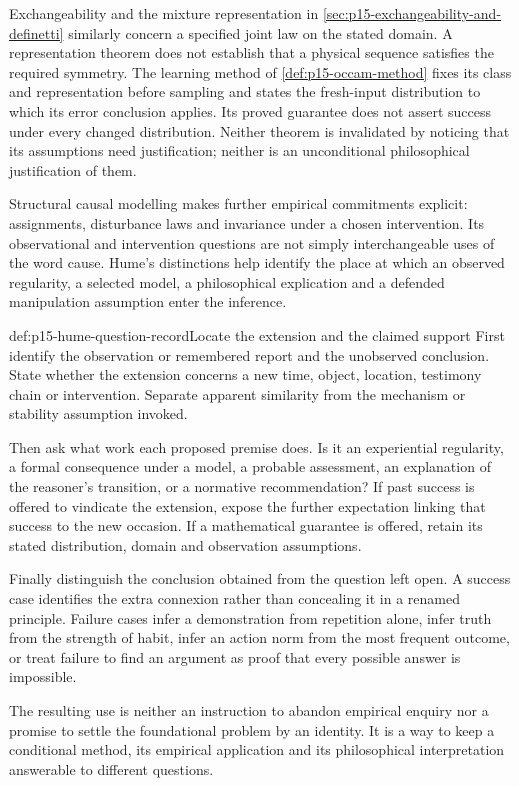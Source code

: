 Exchangeability and the mixture representation in
\cref{sec:p15-exchangeability-and-definetti} similarly concern a
specified joint law on the stated domain. A representation theorem
does not establish that a physical sequence satisfies the required
symmetry. The learning method of \cref{def:p15-occam-method} fixes
its class and representation before sampling and states the
fresh-input distribution to which its error conclusion applies.
Its proved guarantee does not assert success under every changed
distribution. Neither theorem is invalidated by noticing that
its assumptions need justification; neither is an unconditional
philosophical justification of them.

Structural causal modelling makes further empirical commitments
explicit: assignments, disturbance laws and invariance under a
chosen intervention. Its observational and intervention questions
are not simply interchangeable uses of the word cause. Hume's
distinctions help identify the place at which an observed
regularity, a selected model, a philosophical explication and
a defended manipulation assumption enter the inference.

\begin{hbmethod}{def:p15-hume-question-record}{Locate the extension and the claimed support}
First identify the observation or remembered report and the
unobserved conclusion. State whether the extension concerns a
new time, object, location, testimony chain or intervention.
Separate apparent similarity from the mechanism or stability
assumption invoked.

Then ask what work each proposed premise does. Is it an
experiential regularity, a formal consequence under a model,
a probable assessment, an explanation of the reasoner's
transition, or a normative recommendation? If past success
is offered to vindicate the extension, expose the further
expectation linking that success to the new occasion.
If a mathematical guarantee is offered, retain its stated
distribution, domain and observation assumptions.

Finally distinguish the conclusion obtained from the question
left open. A success case identifies the extra connexion
rather than concealing it in a renamed principle. Failure
cases infer a demonstration from repetition alone, infer
truth from the strength of habit, infer an action norm from
the most frequent outcome, or treat failure to find an
argument as proof that every possible answer is impossible.
\end{hbmethod}

The resulting use is neither an instruction to abandon
empirical enquiry nor a promise to settle the foundational
problem by an identity. It is a way to keep a conditional
method, its empirical application and its philosophical
interpretation answerable to different questions.

